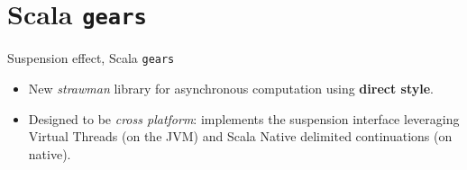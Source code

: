 \documentclass[aspectratio=169,xcolor=dvipsnames]{beamer}
\begin{document}
\section{Scala \texttt{gears}}

\begin{frame}{Suspension effect, Scala \texttt{gears} \cite{gears}}
    \begin{itemize}
        \item New \emph{strawman} library for asynchronous computation using \textbf{direct style}.
        \item Designed to be \emph{cross platform}: implements the suspension interface leveraging Virtual Threads (on the JVM) and Scala Native delimited continuations (on native).
    \end{itemize}
\end{frame}

\end{document}
